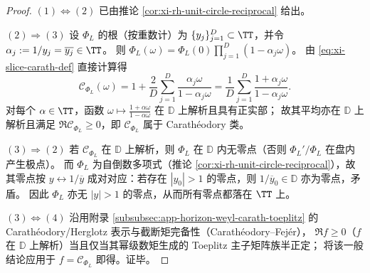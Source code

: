 \begin{proof}
\((1)\Longleftrightarrow(2)\) 已由推论 \ref{cor:xi-rh-unit-circle-reciprocal} 给出。
\par
\((2)\Rightarrow(3)\) 设 \(\Phi_L\) 的根（按重数计）为 \(\{y_j\}_{j=1}^{D}\subset\TT\)，并令 \(\alpha_j:=1/y_j=\overline{y_j}\in\TT\)。
则 \(\Phi_L(\omega)=\Phi_L(0)\prod_{j=1}^{D}(1-\alpha_j\omega)\)。
由 \eqref{eq:xi-slice-carath-def} 直接计算得
\[
\mathscr{C}_{\Phi_L}(\omega)
=1+\frac{2}{D}\sum_{j=1}^{D}\frac{\alpha_j\omega}{1-\alpha_j\omega}
=\frac{1}{D}\sum_{j=1}^{D}\frac{1+\alpha_j\omega}{1-\alpha_j\omega}.
\]
对每个 \(\alpha\in\TT\)，函数 \(\omega\mapsto\frac{1+\alpha\omega}{1-\alpha\omega}\) 在 \(\mathbb{D}\) 上解析且具有正实部；
故其平均亦在 \(\mathbb{D}\) 上解析且满足 \(\Re\mathscr{C}_{\Phi_L}\ge 0\)，即 \(\mathscr{C}_{\Phi_L}\) 属于 Carath\'eodory 类。
\par
\((3)\Rightarrow(2)\) 若 \(\mathscr{C}_{\Phi_L}\) 在 \(\mathbb{D}\) 上解析，则 \(\Phi_L\) 在 \(\mathbb{D}\) 内无零点（否则 \(\Phi_L'/\Phi_L\) 在盘内产生极点）。
而 \(\Phi_L\) 为自倒数多项式（推论 \ref{cor:xi-rh-unit-circle-reciprocal}），故其零点按 \(y\leftrightarrow 1/\overline y\) 成对对应：若存在 \(|y_0|>1\) 的零点，则 \(1/\overline y_0\in\mathbb{D}\) 亦为零点，矛盾。
因此 \(\Phi_L\) 亦无 \(|y|>1\) 的零点，从而所有零点都落在 \(\TT\) 上。
\par
\((3)\Longleftrightarrow(4)\) 沿用附录 \ref{subsubsec:app-horizon-weyl-carath-toeplitz} 的 Carath\'eodory/Herglotz 表示与截断矩完备性（Carath\'eodory--Fej\'er），
\(\Re f\ge 0\)（\(f\) 在 \(\mathbb{D}\) 上解析）当且仅当其幂级数矩生成的 Toeplitz 主子矩阵族半正定；
将该一般结论应用于 \(f=\mathscr{C}_{\Phi_L}\) 即得。证毕。
\end{proof}

